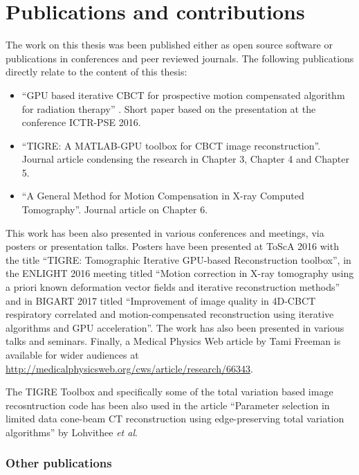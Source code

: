 \FloatBarrier


\section{Publications and contributions}

The work on this thesis was been published either as open source software or publications in conferences and peer reviewed journals. The following publications directly relate to the content of this thesis:

\begin{itemize}
\item ``GPU based iterative CBCT for prospective motion compensated algorithm for radiation therapy''\cite{biguri2016gpu} . Short paper based on the presentation at the conference ICTR-PSE 2016.
\item ``TIGRE: A MATLAB-GPU toolbox for CBCT image reconstruction''\cite{TIGRE}. Journal article condensing the research in Chapter 3, Chapter 4 and Chapter 5.
\item  ``A General Method for Motion Compensation in X-ray Computed Tomography''\cite{biguri2017general}. Journal article on Chapter 6.
\end{itemize}

This work has been also presented in various conferences and meetings, via posters or presentation talks. Posters have been presented at ToScA 2016 with the title ``TIGRE: Tomographic Iterative GPU-based Reconstruction toolbox''\cite{biguri_ander_2016_159016}, in the ENLIGHT 2016 meeting titled ``Motion correction in X-ray tomography using a priori known deformation vector fields and iterative reconstruction methods''\cite{biguri2016motion} and in BIGART 2017 titled ``Improvement of image quality in 4D-CBCT respiratory correlated and motion-compensated reconstruction using iterative algorithms and GPU acceleration''\cite{biguri2017motion}. The work has also been presented in various talks and seminars. Finally, a Medical Physics Web article by Tami Freeman is available for wider audiences at \href{http://medicalphysicsweb.org/cws/article/research/66343}{http://medicalphysicsweb.org/cws/article/research/66343}.

The TIGRE Toolbox and specifically some of the total variation based image recosntruction code has been also used in the article ``Parameter selection in limited data cone-beam CT reconstruction using edge-preserving total variation algorithms'' by Lohvithee \textit{et al}\cite{Vee}.

\subsubsection{Other publications}

